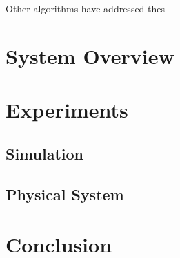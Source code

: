 \documentclass[11pt]{article}
\begin{document}
Other algorithms have addressed thes




\section{System Overview}



\section{Experiments}


\subsection{Simulation}

\subsection{Physical System}



\section{Conclusion}




















\end{document}
